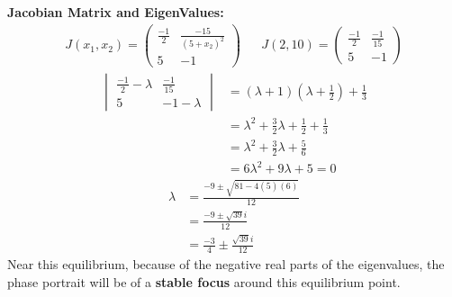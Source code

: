 \documentclass[12pt]{article}
\begin{document}
\noindent \textbf{Jacobian Matrix and EigenValues: }
	\begin{align*}
	J(x_1,x_2) = 
	\begin{pmatrix}
		\frac{-1}{2} & \frac{-15}{(5 +x_2)^2} \\[10pt]
		5 & -1
	\end{pmatrix} &&
	J(2,10) = 
	\begin{pmatrix}
		\frac{-1}{2} & \frac{-1}{15} \\[10pt]
		5 & -1
	\end{pmatrix}
	\end{align*}
	\begin{align*}
		\begin{vmatrix}
			\frac{-1}{2} - \lambda & \frac{-1}{15} \\[10pt]
			5 & -1 - \lambda
		\end{vmatrix}
		&= (\lambda + 1)(\lambda + \frac{1}{2}) + \frac{1}{3} \\
		&=\lambda^2 + \frac{3}{2}\lambda + \frac{1}{2} + \frac{1}{3} \\
		&=\lambda^2 + \frac{3}{2}\lambda + \frac{5}{6} \\
		&= 6\lambda^2 + 9\lambda + 5 = 0
	\end{align*}
	\begin{align*}
		\lambda &= \frac{-9 \pm \sqrt{81 - 4(5)(6)}}{12} \\
		&= \frac{-9 \pm \sqrt{39}i}{12} \\
		&= \frac{-3}{4} \pm \frac{\sqrt{39}i}{12}
	\end{align*}
Near this equilibrium, because of the negative real parts of the eigenvalues, the phase portrait will be of a \textbf{stable focus} around this equilibrium point.

\newpage 
\end{document}
